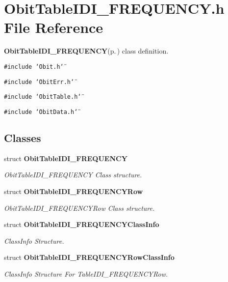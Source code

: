 \section{Obit\-Table\-IDI\_\-FREQUENCY.h File Reference}
\label{ObitTableIDI__FREQUENCY_8h}
{\bf Obit\-Table\-IDI\_\-FREQUENCY}{\rm (p.\,\pageref{structObitTableIDI__FREQUENCY})} class definition. 

{\tt \#include \char`\"{}Obit.h\char`\"{}}\par
{\tt \#include \char`\"{}Obit\-Err.h\char`\"{}}\par
{\tt \#include \char`\"{}Obit\-Table.h\char`\"{}}\par
{\tt \#include \char`\"{}Obit\-Data.h\char`\"{}}\par
\subsection*{Classes}
\begin{CompactItemize}
\item 
struct {\bf Obit\-Table\-IDI\_\-FREQUENCY}
\begin{CompactList}\small\item\em Obit\-Table\-IDI\_\-FREQUENCY Class structure. \item\end{CompactList}\item 
struct {\bf Obit\-Table\-IDI\_\-FREQUENCYRow}
\begin{CompactList}\small\item\em Obit\-Table\-IDI\_\-FREQUENCYRow Class structure. \item\end{CompactList}\item 
struct {\bf Obit\-Table\-IDI\_\-FREQUENCYClass\-Info}
\begin{CompactList}\small\item\em Class\-Info Structure. \item\end{CompactList}\item 
struct {\bf Obit\-Table\-IDI\_\-FREQUENCYRow\-Class\-Info}
\begin{CompactList}\small\item\em Class\-Info Structure For Table\-IDI\_\-FREQUENCYRow. \item\end{CompactList}\end{CompactItemize}
